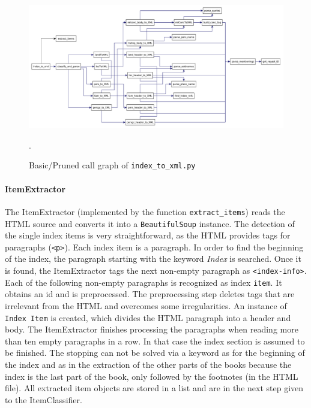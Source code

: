 \begin{figure}[h]
  \centering
  \includegraphics[scale=0.37]{img/index-to-xml}
  \caption{Basic/Pruned call graph of \texttt{index\_to\_xml.py}}.
  \label{fig:index-to-xml}
\end{figure}

\paragraph{ItemExtractor}
The ItemExtractor (implemented by the function \texttt{extract\_items}) reads the HTML source and converts it into a \texttt{BeautifulSoup} instance. The detection of the single index items is very straightforward, as the HTML provides tags for paragraphs (\texttt{<p>}). Each index item is a paragraph. In order to find the beginning of the index, the paragraph starting with the keyword \textit{Index} is searched. Once it is found, the ItemExtractor tags the next non-empty paragraph as \texttt{<index-info>}. Each of the following non-empty paragraphs is recognized as index \texttt{item}. It obtains an id and is preprocessed. The preprocessing step deletes tags that are irrelevant from the HTML and overcomes some irregularities. An instance of \texttt{Index Item} is created, which divides the HTML paragraph into a header and body. The ItemExtractor finishes processing the paragraphs when reading more than ten empty paragraphs in a row. In that case the index section is assumed to be finished. The stopping can not be solved via a keyword as for the beginning of the index and as in the extraction of the other parts of the books because the index is the last part of the book, only followed by the footnotes (in the HTML file). All extracted item objects are stored in a list and are in the next step given to the ItemClassifier.

